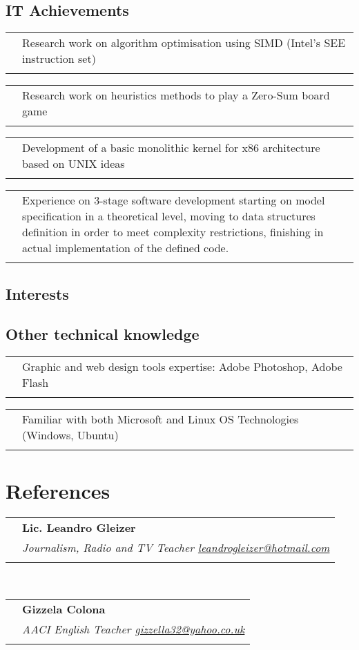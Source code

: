 \documentclass[a4paper,10pt]{article}
\newcommand{\resEntry}[1]{
\begin{tabular}{p{1.7cm}|p{11cm}}
& #1 \\
\multicolumn{2}{c}{}\
\end{tabular}
}
\newcommand{\resEntryD}[2]{
\begin{tabular}{p{1.7cm}|p{11cm}}
& #1 \\
& \emph{#2} \\
\multicolumn{2}{c}{}\
\end{tabular}
}
\begin{document}
\subsection{IT Achievements}

\resEntry{Research work on algorithm optimisation using SIMD (Intel's SEE instruction set)}{}

\resEntry{Research work on heuristics methods to play a Zero-Sum board game}{}

\resEntry{Development of a basic monolithic kernel for x86 architecture based on UNIX ideas}{}

\resEntry{Experience on 3-stage software development starting on model specification in a theoretical level, %
moving to data structures definition in order to meet complexity restrictions, finishing in actual implementation %
of the defined code.}

\subsection{Interests}

\subsection{Other technical knowledge}

\resEntry{Graphic and web design tools expertise: Adobe Photoshop, Adobe Flash}{}

\resEntry{Familiar with both Microsoft and Linux OS Technologies (Windows, Ubuntu)}{}


\section{References}
\resEntryD{\textbf{Lic. Leandro Gleizer}}%
{Journalism, Radio and TV Teacher \newline
\href{mailto:leandrogleizer@hotmail.com}{leandrogleizer@hotmail.com}}\\

\resEntryD{\textbf{Gizzela Colona}}%
{AACI English Teacher \newline
\href{mailto:gizzella32@yahoo.co.uk}{gizzella32@yahoo.co.uk}}\\
\end{document}
